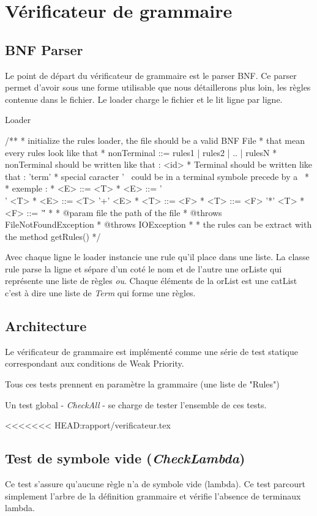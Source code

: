 \section{Vérificateur de grammaire}
	\subsection{BNF Parser}
	Le point de départ du vérificateur de grammaire est le parser BNF. Ce parser permet d'avoir sous une forme utilisable que nous détaillerons 
plus loin, les règles contenue dans le fichier. Le loader charge le fichier et le lit ligne par ligne.

Loader
\begin{verbatim*}
	/**
	 * initialize the rules loader, the file should be a valid BNF File
	 * that mean every rules look like that
	 * nonTerminal ::= rules1 | rules2 | .. | rulesN
	 * nonTerminal should be written like that : <id>
	 * Terminal should be written like that : 'term'
	 * special caracter  ' \ could be in a terminal symbole precede by a \
	 * 
	 * exemple : 
	 * <E> ::= <T> 
	 * <E> ::= '\\' <T> 
	 * <E> ::= <T> '+' <E>
	 * <T> ::= <F>
	 * <T> ::= <F> '*' <T> 
	 * <F> ::= '\''
	 *  
	 * @param file the path of the file
	 * @throws FileNotFoundException
	 * @throws IOException
	 * 
	 * the rules can be extract with the method getRules()
	 */
\end{verbatim*}

Avec chaque ligne le loader instancie une rule qu'il place dans une liste. La classe rule parse la ligne et sépare d'un coté le nom et de l'autre
une orListe qui représente une liste de règles \textit{ou}. Chaque éléments de la orList est une catList c'est à dire une liste de \textit{Term} qui forme une règles.

	\subsection{Architecture}
	Le vérificateur de grammaire est implémenté comme une série de test
	statique correspondant aux conditions de Weak Priority.
	
	Tous ces tests prennent en paramètre la grammaire (une liste de "Rules")

	Un test global - \emph{CheckAll} - se charge de tester l'ensemble de ces tests.

<<<<<<< HEAD:rapport/verificateur.tex
	\subsection{Test de symbole vide (\emph{CheckLambda})}
		Ce test s'assure qu'aucune règle n'a de symbole vide (lambda).
		Ce test parcourt simplement l'arbre de la définition grammaire et
		vérifie l'absence de terminaux lambda.
